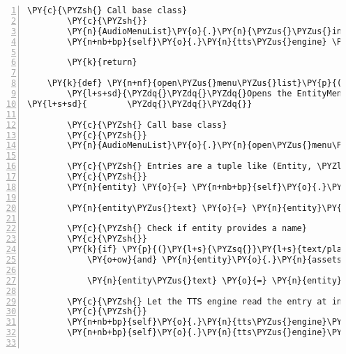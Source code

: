 \begin{Verbatim}[commandchars=\\\{\},numbers=left,firstnumber=1,stepnumber=1]
        \PY{c}{\PYZsh{} Call base class}
        \PY{c}{\PYZsh{}}
        \PY{n}{AudioMenuList}\PY{o}{.}\PY{n}{\PYZus{}\PYZus{}init\PYZus{}\PYZus{}}\PY{p}{(}\PY{n+nb+bp}{self}\PY{p}{,} \PY{n+nb}{list}\PY{p}{,} \PY{n}{menu\PYZus{}sound}\PY{p}{,} \PY{n}{empty\PYZus{}sound}\PY{p}{,} \PY{n}{channel}\PY{p}{,} \PY{n}{callback\PYZus{}on\PYZus{}entry\PYZus{}selected}\PY{p}{,} \PY{n}{callback\PYZus{}on\PYZus{}exit}\PY{p}{)}
        \PY{n+nb+bp}{self}\PY{o}{.}\PY{n}{tts\PYZus{}engine} \PY{o}{=} \PY{n}{tts\PYZus{}engine}

        \PY{k}{return}

    \PY{k}{def} \PY{n+nf}{open\PYZus{}menu\PYZus{}list}\PY{p}{(}\PY{n+nb+bp}{self}\PY{p}{)}\PY{p}{:}
        \PY{l+s+sd}{\PYZdq{}\PYZdq{}\PYZdq{}Opens the EntityMenuList and reads out the identifier or text/plain asset of the first Entity in the list.}
\PY{l+s+sd}{        \PYZdq{}\PYZdq{}\PYZdq{}}

        \PY{c}{\PYZsh{} Call base class}
        \PY{c}{\PYZsh{}}
        \PY{n}{AudioMenuList}\PY{o}{.}\PY{n}{open\PYZus{}menu\PYZus{}list}\PY{p}{(}\PY{n+nb+bp}{self}\PY{p}{)}

        \PY{c}{\PYZsh{} Entries are a tuple like (Entity, \PYZlt{}Entity.identifier|location\PYZgt{})}
        \PY{c}{\PYZsh{}}
        \PY{n}{entity} \PY{o}{=} \PY{n+nb+bp}{self}\PY{o}{.}\PY{n}{list}\PY{p}{[}\PY{n+nb+bp}{self}\PY{o}{.}\PY{n}{list\PYZus{}index}\PY{p}{]}\PY{p}{[}\PY{l+m+mi}{0}\PY{p}{]}

        \PY{n}{entity\PYZus{}text} \PY{o}{=} \PY{n}{entity}\PY{o}{.}\PY{n}{identifier}

        \PY{c}{\PYZsh{} Check if entity provides a name}
        \PY{c}{\PYZsh{}}
        \PY{k}{if} \PY{p}{(}\PY{l+s}{\PYZsq{}}\PY{l+s}{text/plain}\PY{l+s}{\PYZsq{}} \PY{o+ow}{in} \PY{n}{entity}\PY{o}{.}\PY{n}{assets}\PY{o}{.}\PY{n}{keys}\PY{p}{(}\PY{p}{)}
            \PY{o+ow}{and} \PY{n}{entity}\PY{o}{.}\PY{n}{assets}\PY{p}{[}\PY{l+s}{\PYZsq{}}\PY{l+s}{text/plain}\PY{l+s}{\PYZsq{}}\PY{p}{]}\PY{o}{.}\PY{n}{data} \PY{o+ow}{is} \PY{o+ow}{not} \PY{n+nb+bp}{None}\PY{p}{)}\PY{p}{:}

            \PY{n}{entity\PYZus{}text} \PY{o}{=} \PY{n}{entity}\PY{o}{.}\PY{n}{assets}\PY{p}{[}\PY{l+s}{\PYZsq{}}\PY{l+s}{text/plain}\PY{l+s}{\PYZsq{}}\PY{p}{]}\PY{o}{.}\PY{n}{data}\PY{p}{[}\PY{l+m+mi}{0}\PY{p}{]}

        \PY{c}{\PYZsh{} Let the TTS engine read the entry at index}
        \PY{c}{\PYZsh{}}
        \PY{n+nb+bp}{self}\PY{o}{.}\PY{n}{tts\PYZus{}engine}\PY{o}{.}\PY{n}{say}\PY{p}{(}\PY{n}{entity\PYZus{}text}\PY{p}{)}
        \PY{n+nb+bp}{self}\PY{o}{.}\PY{n}{tts\PYZus{}engine}\PY{o}{.}\PY{n}{runAndWait}\PY{p}{(}\PY{p}{)}


\end{Verbatim}
